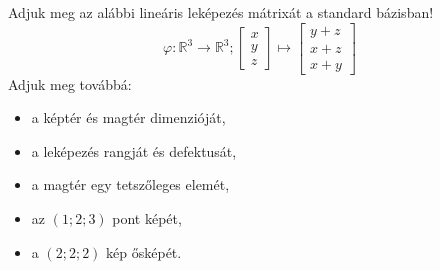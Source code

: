 \documentclass[exercise]{math-standalone}
\begin{document}
\begin{exercise}{%
    Adjuk meg az alábbi lineáris leképezés mátrixát a standard bázisban!
  }
  \[
    \varphi: \mathbb R^3 \rightarrow \mathbb R^3;
    \begin{bmatrix}
      x \\ y \\ z
    \end{bmatrix} \mapsto \begin{bmatrix}
      y + z \\
      x + z \\
      x + y
    \end{bmatrix}
  \]
  Adjuk meg továbbá:
  \begin{itemize}
    \item a képtér és magtér dimenzióját,
    \item a leképezés rangját és defektusát,
    \item a magtér egy tetszőleges elemét,
    \item az $(1; 2; 3)$ pont képét,
    \item a $(2; 2; 2)$ kép ősképét.
  \end{itemize}

\end{exercise}
\end{document}

